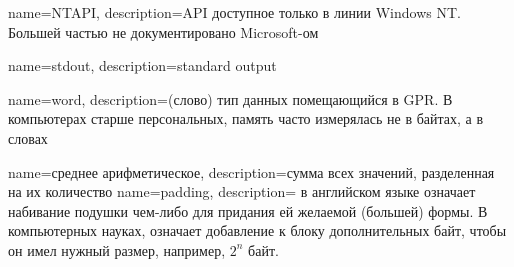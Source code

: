 {
  name=NTAPI,
  description={\ac{API} доступное только в линии Windows NT. 
  Большей частью не документировано Microsoft-ом}
}

{
  name=stdout,
  description={standard output}
}

{
  name=word,
  description={(слово) тип данных помещающийся в \ac{GPR}. 
  В компьютерах старше персональных, память часто измерялась не в байтах, 
  а в словах}
}

{
  name=среднее арифметическое,
  description={сумма всех значений, разделенная на их количество}
}
{
  name=padding,
  description= в английском языке означает набивание подушки чем-либо для придания ей желаемой (большей)
  формы. В компьютерных науках,  означает добавление к блоку дополнительных байт, чтобы он имел нужный
  размер, например, $2^n$ байт.
}


